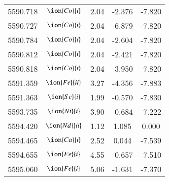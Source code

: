 \documentclass[fleqn,usenatbib]{mnras}
\begin{document}
\begin{center}
\begin{table}
\begin{tabular}{ccccc}
5590.718 &  $\ion{Co}{i}$  & 2.04 & -2.376 & -7.820 \\ 
5590.727 &  $\ion{Co}{i}$  & 2.04 & -6.879 & -7.820 \\ 
5590.784 &  $\ion{Co}{i}$  & 2.04 & -2.604 & -7.820 \\ 
5590.812 &  $\ion{Co}{i}$  & 2.04 & -2.421 & -7.820 \\ 
5590.818 &  $\ion{Co}{i}$  & 2.04 & -3.950 & -7.820 \\ 
5591.359 &  $\ion{Fe}{ii}$  & 3.27 & -4.356 & -7.883 \\ 
5591.363 &  $\ion{Sc}{i}$  & 1.99 & -0.570 & -7.830 \\ 
5593.735 &  $\ion{Ni}{i}$  & 3.90 & -0.684 & -7.222 \\ 
5594.420 &  $\ion{Nd}{ii}$  & 1.12 & 1.085 & 0.000 \\ 
5594.465 &  $\ion{Ca}{i}$  & 2.52 & 0.044 & -7.539 \\ 
5594.655 &  $\ion{Fe}{i}$  & 4.55 & -0.657 & -7.510 \\ 
5595.060 &  $\ion{Fe}{i}$  & 5.06 & -1.631 & -7.370 \\ 
 \end{tabular}
 \end{table}
 \end{center}
\end{document}
